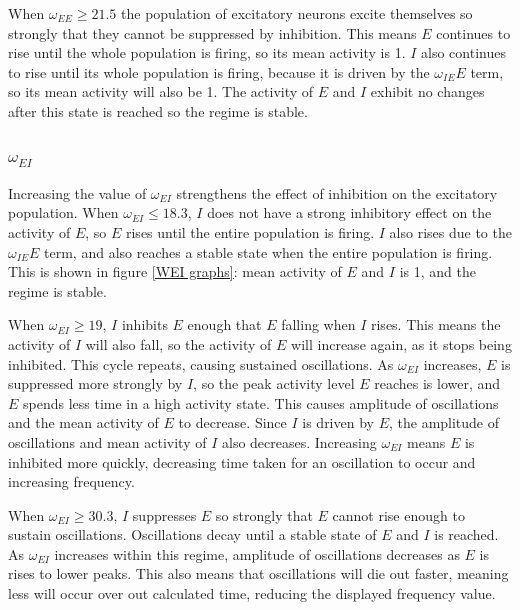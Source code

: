 \documentclass[10pt]{article}
\begin{document}
\begin{flushleft}
\begin{flushleft}
    When $\omega_{EE} \geq 21.5$ the population of excitatory neurons excite themselves so strongly that they cannot be suppressed by inhibition. This means $E$ continues to rise until the whole population is firing, so its mean activity is 1. $I$ also continues to rise until its whole population is firing, because it is driven by the $\omega_{IE}E$ term, so its mean activity will also be 1. The activity of $E$ and $I$ exhibit no changes after this state is reached so the regime is stable.
\end{flushleft}


\subsubsection{$\omega_{EI}$}

Increasing the value of $\omega_{EI}$ strengthens the effect of inhibition on the excitatory population. When $\omega_{EI} \leq 18.3$, $I$ does not have a strong inhibitory effect on the activity of $E$, so $E$ rises until the entire population is firing. $I$ also rises due to the $\omega_{IE}E$ term, and also reaches a stable state when the entire population is firing. This is shown in figure \ref{WEI graphs}: mean activity of $E$ and $I$ is 1, and the regime is stable.
\newline

When $\omega_{EI} \geq 19$, $I$ inhibits $E$ enough that $E$ falling when $I$ rises. This means the activity of $I$ will also fall, so the activity of $E$ will increase again, as it stops being inhibited. This cycle repeats, causing sustained oscillations. As $\omega_{EI}$ increases, $E$ is suppressed more strongly by $I$, so the peak activity level $E$ reaches is lower, and $E$ spends less time in a high activity state. This causes amplitude of oscillations and the mean activity of $E$ to decrease. Since $I$ is driven by $E$, the amplitude of oscillations and mean activity of $I$ also decreases. Increasing $\omega_{EI}$ means $E$ is inhibited more quickly, decreasing time taken for an oscillation to occur and increasing frequency.
\newline

When $\omega_{EI} \geq 30.3$, $I$ suppresses $E$ so strongly that $E$ cannot rise enough to sustain oscillations. Oscillations decay until a stable state of $E$ and $I$ is reached. As $\omega_{EI}$ increases within this regime, amplitude of oscillations decreases as $E$ is rises to lower peaks. This also means that oscillations will die out faster, meaning less will occur over out calculated time, reducing the displayed frequency value.


\end{flushleft}
\end{document}
